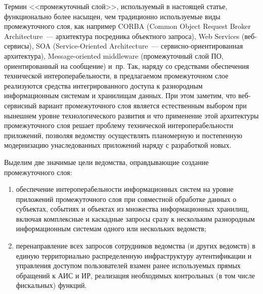 \begin{multicols}{2}
      Термин <<промежуточный слой>>, исполь\-зу\-емый в настоящей статье, функционально 
более насыщен, чем традиционно используемые виды\linebreak
 промежуточного слоя, как например 
CORBA
 (Common Object Request Broker Architecture~--- архитектура посредника объектного
запроса), Web Services (веб-сер\-ви\-сы), SOA (Service-Oriented Architecture~--- 
сер\-вис\-но-ориен\-ти\-ро\-ван\-ная архитектура), 
Message-oriented middleware (промежуточный слой ПО, ориентированный на сообщение) 
и~пр. Так, наряду со средствами 
обеспечения технической ин\-тер\-опе\-ра\-бель\-ности, в предлагаемом промежуточном слое 
реализуются средства интегрированного доступа к разнородным информационным системам и 
хранилищам данных. При этом заметим, что веб-сер\-вис\-ный вариант промежуточного слоя 
является естественным выбором при нынешнем уровне технологического  
развития и что применение этой архитектуры промежуточного слоя решает проблему  
технической интероперабельности приложений, позволяя ведомству осуществлять 
планомерную и постепенную модернизацию унаследованных приложений наряду с 
разработкой новых.
      
      Выделим две значимые цели ведомства, оправдывающие создание промежуточного 
слоя:
      \begin{enumerate}[(1)]
\item обеспечение интероперабельности информационных систем на уровне приложений 
промежуточного слоя при совместной обработке данных о субъектах, событиях и объектах из\linebreak 
множества информационных хранилищ, включая комплексные и каскадные запросы сразу к 
нескольким разнородным информационным сис\-те\-мам одного или нескольких ведомств;
      \item перенаправление всех запросов сотрудников ведомства (и других ведомств) в 
единую территориально распределенную инфраструктуру аутентификации и управления 
доступом пользователей взамен ранее используемых прямых обращений к АИС и 
ИР, реализация необходимых контрольных (в том числе фискальных) 
функций.
      \end{enumerate}
      \pagebreak
      
      \end{multicols}

\begin{figure} %
\vspace*{1pt}
\begin{center}
\mbox{%
\epsfxsize=95.847mm
}
\end{center}
\vspace*{-9pt}
\vspace*{3pt}
\end{figure}

